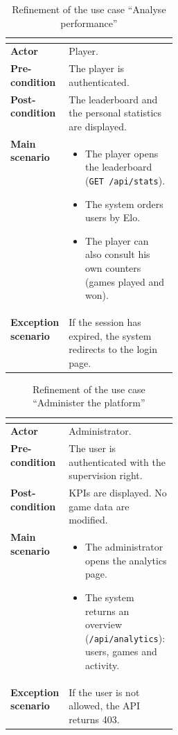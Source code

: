 \documentclass[12pt,a4paper,oneside]{report}
\begin{document}
\begin{table}[H]
\centering
\caption{Refinement of the use case ``Analyse performance''}
\label{tab:uc-stats}
\renewcommand{\arraystretch}{1.20}
\begin{tabularx}{\linewidth}{|>{\raggedright\bfseries}p{0.28\linewidth}|X|}
\hline
\rowcolor{sectionblue}
\multicolumn{2}{|c|}{\textcolor{white}{\textbf{Analyse performance}}} \\
\hline
Actor & Player. \\
\hline
Pre-condition & The player is authenticated. \\
\hline
Post-condition & The leaderboard and the personal statistics are displayed. \\
\hline
Main scenario &
\begin{itemize}[leftmargin=1.1em,itemsep=0.15em,topsep=0.2em]
  \item The player opens the leaderboard (\texttt{GET /api/stats}).
  \item The system orders users by Elo.
  \item The player can also consult his own counters (games played and won).
\end{itemize} \\
\hline
Exception scenario &
If the session has expired, the system redirects to the login page. \\
\hline
\end{tabularx}
\end{table}

\begin{table}[H]
\centering
\caption{Refinement of the use case ``Administer the platform''}
\label{tab:uc-admin}
\renewcommand{\arraystretch}{1.20}
\begin{tabularx}{\linewidth}{|>{\raggedright\bfseries}p{0.28\linewidth}|X|}
\hline
\rowcolor{sectionblue}
\multicolumn{2}{|c|}{\textcolor{white}{\textbf{Administer the platform}}} \\
\hline
Actor & Administrator. \\
\hline
Pre-condition & The user is authenticated with the supervision right. \\
\hline
Post-condition & KPIs are displayed. No game data are modified. \\
\hline
Main scenario &
\begin{itemize}[leftmargin=1.1em,itemsep=0.15em,topsep=0.2em]
  \item The administrator opens the analytics page.
  \item The system returns an overview (\texttt{/api/analytics}): users, games and activity.
\end{itemize} \\
\hline
Exception scenario &
If the user is not allowed, the API returns 403. \\
\hline
\end{tabularx}
\end{table}
\end{document}
